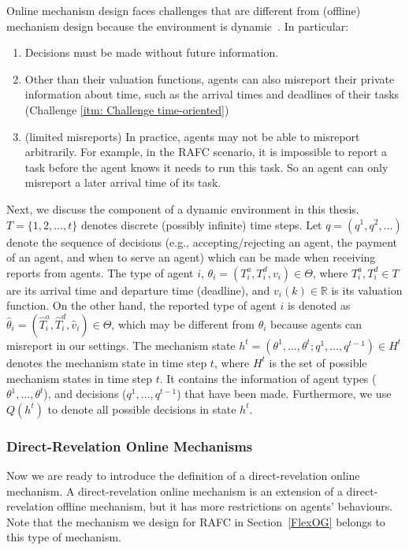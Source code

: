 \documentclass[11pt]{phdthesis}
\begin{document}
Online mechanism design faces challenges that are different from (offline) mechanism design because the environment is dynamic~\citep[Chapter 16]{nisan2007algorithmic}. In particular:
\begin{enumerate}
	\item Decisions must be made without future information.
	\item Other than their valuation functions, agents can also misreport their private information about time, such as the arrival times and deadlines of their tasks (Challenge \ref{itm: Challenge time-oriented})
	\item (limited misreports) In practice, agents may not be able to misreport arbitrarily. For example, in the RAFC scenario, it is impossible to report a task before the agent knows it needs to run this task. So an agent can only misreport a later arrival time of its task.
\end{enumerate}

Next, we discuss the component of a dynamic environment in this thesis. $T = \{ 1,2,\ldots,t \}$ denotes discrete (possibly infinite) time steps. Let $q = (q^1,q^2,\ldots)$ denote the sequence of decisions (e.g., accepting/rejecting an agent, the payment of an agent, and when to serve an agent) which can be made when receiving reports from agents. The type of agent $ i $, $\theta_i = (T_i^a,T_i^d,v_i) \in \Theta$, where $T_i^a,T_i^d \in T$ are its arrival time and departure time (deadline), and $ v_i(k) \in \mathbb{R} $ is its valuation function. On the other hand, the reported type of agent $ i $ is denoted as $\hat{\theta}_i = (\hat{T}_i^a,\hat{T}_i^d,\hat{v}_i) \in \Theta$, which may be different from $ \theta_{i} $ because agents can misreport in our settings. The mechanism state $h^t = (\theta^1,\ldots, \theta^t; q^1,\ldots,q^{t-1}) \in H^t$ denotes the mechanism state in time step $ t $, where $ H^t $ is the set of possible mechanism states in time step $ t $. It contains the information of agent types ($\theta^1,\ldots, \theta^t$), and decisions ($q^1,\ldots,q^{t-1}$) that have been made. Furthermore, we use $ Q(h^t) $ to denote all possible decisions in state $ h^t $. ~\citep[Section 16.2]{nisan2007algorithmic}
\subsubsection{Direct-Revelation Online Mechanisms} \label{direct-revelation online mechanisms}


Now we are ready to introduce the definition of a direct-revelation online mechanism. A direct-revelation online mechanism is an extension of a direct-revelation offline mechanism, but it has more restrictions on agents' behaviours. Note that the mechanism we design for RAFC in Section~\ref{FlexOG} belongs to this type of mechanism.
\end{document}
